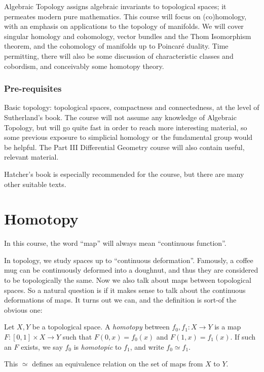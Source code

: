 \documentclass[a4paper]{article}
\begin{document}
\maketitle
{\small
\setlength{\parindent}{0em}
\setlength{\parskip}{1em}

Algebraic Topology assigns algebraic invariants to topological spaces; it permeates modern pure mathematics. This course will focus on (co)homology, with an emphasis on applications to the topology of manifolds. We will cover singular homology and cohomology, vector bundles and the Thom Isomorphism theorem, and the cohomology of manifolds up to Poincar\'e duality. Time permitting, there will also be some discussion of characteristic classes and cobordism, and conceivably some homotopy theory.

\subsubsection*{Pre-requisites}

Basic topology: topological spaces, compactness and connectedness, at the level of Sutherland's book. The course will not assume any knowledge of Algebraic Topology, but will go quite fast in order to reach more interesting material, so some previous exposure to simplicial homology or the fundamental group would be helpful. The Part III Differential Geometry course will also contain useful, relevant material.

Hatcher's book is especially recommended for the course, but there are many other suitable texts.
}
\tableofcontents

\section{Homotopy}
In this course, the word ``map'' will always mean ``continuous function''.

In topology, we study spaces up to ``continuous deformation''. Famously, a coffee mug can be continuously deformed into a doughnut, and thus they are considered to be topologically the same. Now we also talk about maps between topological spaces. So a natural question is if it makes sense to talk about the continuous deformations of maps. It turns out we can, and the definition is sort-of the obvious one:

\begin{defi}[Homotopy]
  Let $X, Y$ be a topological space. A \emph{homotopy} between $f_0, f_1: X \to Y$ is a map $F: [0, 1] \times X \to Y$ such that $F(0, x) = f_0(x)$ and $F(1, x) = f_1(x)$. If such an $F$ exists, we say $f_0$ is \emph{homotopic} to $f_1$, and write $f_0 \simeq f_1$.

  This $\simeq$ defines an equivalence relation on the set of maps from $X$ to $Y$.
\end{defi}
\end{document}
